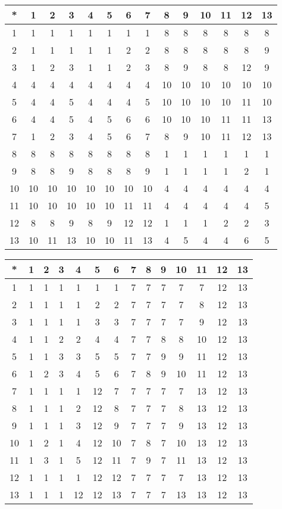 \begin{tabular}[t]{c|ccccccccccccc}
*&1&2&3&4&5&6&7&8&9&10&11&12&13 \\ \hline
    1&1&1&1&1&1&1&1&8&8&8&8&8&8 \\
    2&1&1&1&1&1&2&2&8&8&8&8&8&9 \\
    3&1&2&3&1&1&2&3&8&9&8&8&12&9 \\
    4&4&4&4&4&4&4&4&10&10&10&10&10&10 \\
    5&4&4&5&4&4&4&5&10&10&10&10&11&10 \\
    6&4&4&5&4&5&6&6&10&10&10&11&11&13 \\
    7&1&2&3&4&5&6&7&8&9&10&11&12&13 \\
    8&8&8&8&8&8&8&8&1&1&1&1&1&1 \\
    9&8&8&9&8&8&8&9&1&1&1&1&2&1 \\
    10&10&10&10&10&10&10&10&4&4&4&4&4&4 \\
    11&10&10&10&10&10&11&11&4&4&4&4&4&5 \\
    12&8&8&9&8&9&12&12&1&1&1&2&2&3 \\
    13&10&11&13&10&10&11&13&4&5&4&4&6&5 
\end{tabular}


\begin{tabular}[t]{c|ccccccccccccc}
*&1&2&3&4&5&6&7&8&9&10&11&12&13 \\ \hline
    1&1&1&1&1&1&1&7&7&7&7&7&12&13 \\
    2&1&1&1&1&2&2&7&7&7&7&8&12&13 \\
    3&1&1&1&1&3&3&7&7&7&7&9&12&13 \\
    4&1&1&2&2&4&4&7&7&8&8&10&12&13 \\
    5&1&1&3&3&5&5&7&7&9&9&11&12&13 \\
    6&1&2&3&4&5&6&7&8&9&10&11&12&13 \\
    7&1&1&1&1&12&7&7&7&7&7&13&12&13 \\
    8&1&1&1&2&12&8&7&7&7&8&13&12&13 \\
    9&1&1&1&3&12&9&7&7&7&9&13&12&13 \\
    10&1&2&1&4&12&10&7&8&7&10&13&12&13 \\
    11&1&3&1&5&12&11&7&9&7&11&13&12&13 \\
    12&1&1&1&1&12&12&7&7&7&7&13&12&13 \\
    13&1&1&1&12&12&13&7&7&7&13&13&12&13 
\end{tabular}


